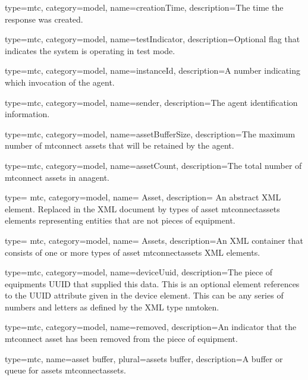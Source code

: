 {
  type=mtc,
  category=model,
  name={creationTime},
  description={The time the response was created.}
}


{
  type=mtc,
  category=model,
  name={testIndicator},
  description={Optional flag that indicates the system is operating in test mode.}
}


{
  type=mtc,
  category=model,
  name={instanceId},
  description={A number indicating which invocation of the \gls{agent}. }
}


{
  type=mtc,
  category=model,
  name={sender},
  description={The \gls{agent} identification information. }
}


{
  type=mtc,
  category=model,
  name={assetBufferSize},
  description={The maximum number of \glspl{mtconnect asset} that will be retained by the \gls{agent}.}
}


{
  type=mtc,
  category=model,
  name={assetCount},
  description={The total number of \glspl{mtconnect asset} in an\gls{agent}.}
}


{
  type= mtc,
  category=model,
  name= {Asset},
  description= {An abstract XML element. Replaced in the XML document by types of \gls{asset mtconnectassets} elements representing entities that are not pieces of equipment.}
}

{
  type= mtc,
  category=model,
  name= {Assets},
  description={An XML container that consists of one or more types of \gls{asset mtconnectassets} XML elements. }
}


{
  type=mtc,
  category=model,
  name={deviceUuid},
  description={The piece of equipments UUID that supplied this data. This is an optional element references to the UUID attribute given in the \gls{device} element. This can be any series of numbers and letters as defined by the XML type \gls{nmtoken}.}
}


{
  type=mtc,
  category=model,
  name={removed},
  description={An indicator that the \gls{mtconnect asset} has been removed from the piece of equipment.}
}


{
  type=mtc,
  name={asset buffer},
  plural={assets buffer},
  description={A buffer or queue for \gls{assets mtconnectassets}.}
}


